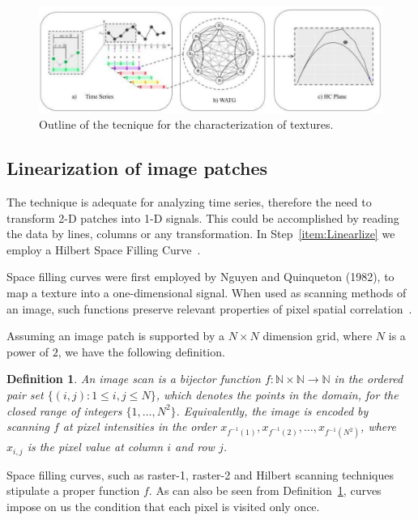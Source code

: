 \documentclass{isprs}
\begin{document}
\begin{figure}[hbt]
	\centering
	\includegraphics[scale = 0.25]{Figures/WATG.pdf}
	\caption{Outline of the tecnique for the characterization of textures.}
	\label{fig:WATG}
\end{figure}

\subsection{Linearization of image patches}\label{linearization}

The technique is adequate for analyzing time series, therefore the need to transform 2-D patches into 1-D signals.
This could be accomplished by reading the data by lines, columns or any transformation.
In Step~\ref{item:Linearlize} we employ a Hilbert Space Filling Curve~\citep{Lee1994Texture}.

Space filling curves were first employed by Nguyen and Quinqueton (1982), to map a texture into a one-dimensional signal.
When used as scanning methods of an image, such functions preserve relevant properties of pixel spatial correlation~\citep{Lee1994Texture}.

Assuming an image patch is supported by a $N \times N$ dimension grid, where $N$ is a power of $2$, we have the following definition.

\newtheorem{mydef}{Definition}
\begin{mydef}
	An image scan is a bijector function $f \colon \mathbb{N} \times \mathbb{N} \to \mathbb{N}$ in the ordered pair set $ \{(i, j): 1 \leq i , j \leq N \}$, which denotes the points in the domain, for the closed range of integers $\{1, \dots, N^2\}$. Equivalently, the image is encoded by scanning $f$ at pixel intensities in the order $x_{f^{-1}(1)}, x_{f^{-1}(2)}, \dots, x_{f^{-1}(N^2)}$, where $x_{i, j}$ is the pixel value at column $i$ and row $j$.
	\label{def:CurveFilling}
\end{mydef}

Space filling curves, such as raster-1, raster-2 and Hilbert scanning techniques stipulate a proper function $f$.
As can also be seen from Definition~\ref{def:CurveFilling}, curves impose on us the condition that each pixel is visited only once.
\end{document}
